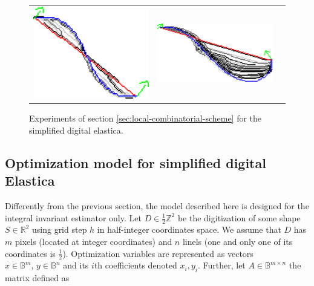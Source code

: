 \begin{figure}[]
\begin{tabular}{ccc}
\includegraphics[scale=0.25]{figures/chapter5/fixed-orientations/selastica/len_pen_0.01/curve-2/summary.pdf} &
\includegraphics[scale=0.25]{figures/chapter5/fixed-orientations/selastica/len_pen_0.01/curve-3/summary.pdf}
\end{tabular}
\caption{Experiments of section \ref{sec:local-combinatorial-scheme} for the simplified digital elastica.}
\label{fig:simplified-elastica}
\end{figure}


\subsection{Optimization model for simplified digital Elastica}
\label{ch6:subsec:optimization-model-simplified-digital-elastica}

Differently from the previous section, the model described here is designed for the integral invariant estimator only. Let $D \in \frac{1}{2}\mathbb{Z}^2$ be the digitization of some shape $S \in \mathbb{R}^2$ using grid step $h$ in half-integer coordinates space. We assume that $D$ has $m$ pixels (located at integer coordinates) and $n$ linels (one and only one of its coordinates is $\frac{1}{2}$). Optimization variables are represented as vectors $x \in \mathbb{B}^{m},\, y \in \mathbb{B}^{n}$ and its $i$th coefficients denoted  $x_i,y_i$.  Further, let $A \in \mathbb{B}^{m\times n}$ the matrix defined as

